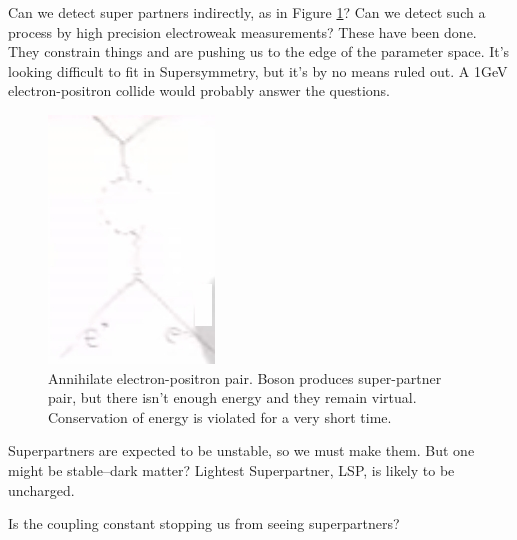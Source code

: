 \documentclass[]{article}
\begin{document}
Can we detect super partners indirectly, as in Figure \ref{fig:particles3-2-superpartners}? Can we detect such a process by high precision electroweak measurements? These have been done. They constrain things and are pushing us to the edge of the parameter space. It's looking difficult to fit in Supersymmetry, but it's by no means ruled out. A 1GeV electron-positron collide would probably answer the questions. 

\begin{figure}[H]
	\caption{Annihilate electron-positron pair. Boson produces super-partner pair, but there isn't enough energy and they remain virtual. Conservation of energy is violated for a very short time.}\label{fig:particles3-2-superpartners}
	\includegraphics{particles3-2-superpartners}
\end{figure}

Superpartners are expected to be unstable, so we must make them. But one might be stable--dark matter? Lightest Superpartner, LSP, is likely to be uncharged.

Is the coupling constant stopping us from seeing superpartners?
\end{document}
